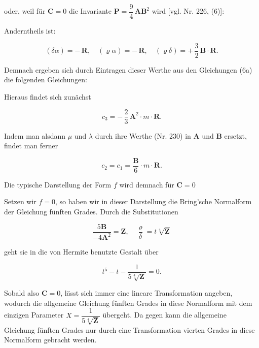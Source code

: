 oder, weil für $\mathbf{C} = 0$ die Invariante $\mathbf{P} = \dfrac94\,\mathbf{A}\mathbf{B}^2$ wird [vgl. Nr. 226, (6)]:


Anderntheils ist:

\[
(\delta\alpha) = -\,\mathbf{R}, \quad (\varrho\alpha) = -\,\mathbf{R}, \quad (\varrho\delta) = +\,\frac32\,\mathbf{B}\cdot\mathbf{R}.
\]

Demnach ergeben sich durch Eintragen dieser Werthe aus den
Gleichungen (6a) die folgenden Gleichungen:


Hieraus findet sich zunächst

\[
c_3 = -\,\frac23\,\mathbf{A}^2\cdot m\cdot\mathbf{R}.
\]


Indem man alsdann $\mu$ und $\lambda$ durch ihre Werthe (Nr. 230) in $\mathbf{A}$
und $\mathbf{B}$ ersetzt, findet man ferner

\[
c_2 = c_1 = \frac{\mathbf{B}}{6}\cdot m\cdot\mathbf{R}.
\]

Die typische Darstellung der Form $f$ wird demnach für $\mathbf{C} = 0$


Setzen wir $f = 0$, so haben wir in dieser Darstellung die
\glqq Bring'sche\grqq{} Normalform der Gleichung fünften Grades. Durch die
Substitutionen

\[
\frac{5\mathbf{B}}{-4\mathbf{A}^2} = \mathbf{Z}, \quad \frac{\varrho}{\delta} = t\sqrt[4]{\mathbf{Z}}
\]

geht sie in die von Hermite benutzte Gestalt über

\[
t^5 - t - \frac{1}{5\sqrt[4]{\mathbf{Z}}} = 0.
\]

Sobald also $\mathbf{C} = 0$, lässt sich immer eine lineare Transformation
angeben, wodurch die allgemeine Gleichung fünften Grades in diese
Normalform mit dem einzigen Parameter $X = \dfrac{1}{5\sqrt[4]{\mathbf{Z}}}$ übergeht. Da\-
gegen kann die allgemeine Gleichung fünften Grades nur durch eine
Transformation vierten Grades in diese Normalform gebracht werden.

